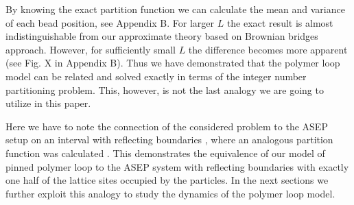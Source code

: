 \documentclass[aps,showpacs,twocolumn,floatfix,prx,superscriptaddress]{revtex4-1}
\begin{document}
By knowing the exact partition function we can calculate the mean and variance of each bead position, see Appendix B. For larger $L$ the exact result is almost indistinguishable from our approximate theory based on Brownian bridges approach. However, for sufficiently small $L$ the difference becomes more apparent (see Fig. X in Appendix B). Thus we have demonstrated that the polymer loop model can be related and solved exactly in terms of the integer number partitioning problem. This, however, is not the last analogy we are going to utilize in this paper.

Here we have to note the connection of the considered problem to the ASEP setup on an interval with reflecting boundaries \cite{}, where an analogous partition function was calculated \cite{}. This demonstrates the equivalence of our model of pinned polymer loop to the ASEP system with reflecting boundaries with exactly one half of the lattice sites occupied by the particles. In the next sections we further exploit this analogy to study the dynamics of the polymer loop model.
\end{document}
